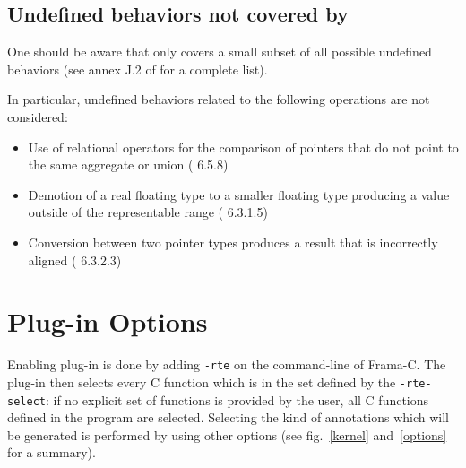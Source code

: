\section{Undefined behaviors not covered by \rte{}}

One should be aware that \rte{} only covers a small subset of all possible
undefined behaviors (see annex J.2 of \cite{standardc99} for a complete list).

In particular, undefined behaviors related to the following operations are not
considered:

\begin{itemize}
\item Use of relational operators for the comparison of pointers that do not
  point to the same aggregate or union (\cnn{} 6.5.8)
\item Demotion of a real floating type to a smaller floating type
  producing a value outside of the representable range (\cnn{} 6.3.1.5)
\item Conversion between two pointer types produces a result that is incorrectly
  aligned (\cnn{} 6.3.2.3)
\end{itemize}


\chapter{Plug-in Options}

Enabling \rte{} plug-in is done by adding \lstinline|-rte| on the command-line
of Frama-C. The plug-in then selects every C function which is in the set
defined by the \lstinline|-rte-select|: if no explicit set of functions is
provided by the user, all C functions defined in the program are selected.
Selecting the kind of annotations which will be generated is performed by using
other \rte{} options (see fig.~\ref{kernel} and~\ref{options} for a summary).

